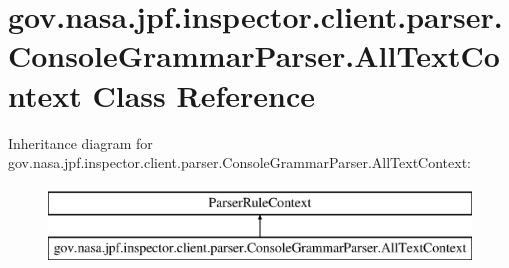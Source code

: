 \hypertarget{classgov_1_1nasa_1_1jpf_1_1inspector_1_1client_1_1parser_1_1_console_grammar_parser_1_1_all_text_context}{}\section{gov.\+nasa.\+jpf.\+inspector.\+client.\+parser.\+Console\+Grammar\+Parser.\+All\+Text\+Context Class Reference}
\label{classgov_1_1nasa_1_1jpf_1_1inspector_1_1client_1_1parser_1_1_console_grammar_parser_1_1_all_text_context}
Inheritance diagram for gov.\+nasa.\+jpf.\+inspector.\+client.\+parser.\+Console\+Grammar\+Parser.\+All\+Text\+Context\+:\begin{figure}[H]
\begin{center}
\leavevmode
\includegraphics[height=2.000000cm]{classgov_1_1nasa_1_1jpf_1_1inspector_1_1client_1_1parser_1_1_console_grammar_parser_1_1_all_text_context}
\end{center}
\end{figure}
